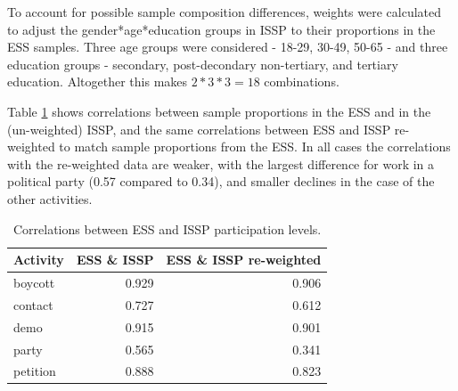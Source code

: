 \documentclass[12pt,]{article}
\begin{document}
To account for possible sample composition differences, weights were calculated to adjust the gender*age*education groups in ISSP to their proportions in the ESS samples. Three age groups were considered - 18-29, 30-49, 50-65 - and three education groups - secondary, post-decondary non-tertiary, and tertiary education. Altogether this makes \(2*3*3=18\) combinations.

Table \ref{tab:sample-re-weighting} shows correlations between sample proportions in the ESS and in the (un-weighted) ISSP, and the same correlations between ESS and ISSP re-weighted to match sample proportions from the ESS. In all cases the correlations with the re-weighted data are weaker, with the largest difference for work in a political party (0.57 compared to 0.34), and smaller declines in the case of the other activities.

\begin{table}[t]

\caption{\label{tab:sample-re-weighting}Correlations between ESS and ISSP participation levels.}
\centering
\fontsize{11}{13}\selectfont
\begin{tabular}{lrr}
\toprule
Activity & ESS \& ISSP & ESS \& ISSP re-weighted\\
\midrule
\rowcolor{gray!6}  boycott & 0.929 & 0.906\\
contact & 0.727 & 0.612\\
\rowcolor{gray!6}  demo & 0.915 & 0.901\\
party & 0.565 & 0.341\\
\rowcolor{gray!6}  petition & 0.888 & 0.823\\
\bottomrule
\end{tabular}
\end{table}
\end{document}
